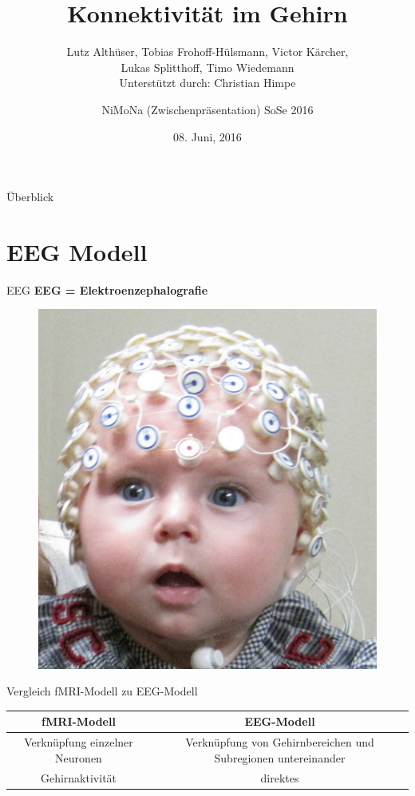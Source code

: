 \documentclass{beamer}
\author{NiMoNa (Zwischenpräsentation) SoSe 2016}
\title{Konnektivität im Gehirn}
\subtitle{Lutz Althüser, Tobias Frohoff-Hülsmann, Victor Kärcher,\\ Lukas Splitthoff, Timo Wiedemann\\ \vspace{0.25cm} Unterstützt durch: Christian Himpe}
\date[08.06.2016]{08. Juni, 2016}
\begin{document}
\begin{frame}[plain]
	  \maketitle
\end{frame}

\begin{frame}{Überblick}

	  \tableofcontents
\end{frame}

\section{EEG Modell}
\begin{frame}{EEG}
\textbf{EEG = Elektroenzephalografie}
\begin{figure}
\centering
\includegraphics[scale=0.3]{res/EEGbaby.png}
\end{figure}
\end{frame}

\begin{frame}{Vergleich fMRI-Modell zu EEG-Modell}
\begin{tabular}{| c | c |}
\hline
\textbf{fMRI-Modell} & \textbf{EEG-Modell} \\
\hline
Verknüpfung einzelner Neuronen & Verknüpfung von Gehirnbereichen und Subregionen untereinander \\
\hline
Gehirnaktivität & direktes 
\end{tabular}
\end{frame}
\end{document}
